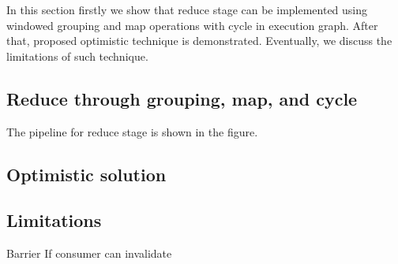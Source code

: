 
\label {fs-optimistic}

In this section firstly we show that reduce stage can be implemented using windowed grouping and map operations with cycle in execution graph. After that, proposed optimistic technique is demonstrated. Eventually, we discuss the limitations of such technique.

\subsection{Reduce through grouping, map, and cycle}
The pipeline for reduce stage is shown in the figure.  

\subsection{Optimistic solution}


\subsection{Limitations}

Barrier
If consumer can invalidate 



